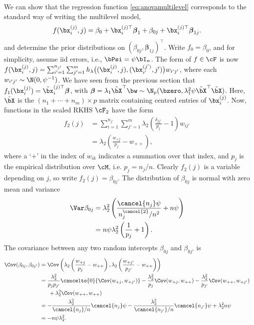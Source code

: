 We can show that the regression function \eqref{eq:anovamultilevel} corresponds to the standard way of writing the multilevel model, 
\[
  f(\bx_i^{(j)}, j) = \beta_0 + \bx_i^{(j)\top}\boldsymbol{\beta}_1 + \beta_{0j} + \bx_i^{(j)\top}\boldsymbol{\beta}_{1j}.   
\]
and determine the prior distributions on $(\beta_{0j},\boldsymbol{\beta}_{1j})^\top$.
Write $f_0=\beta_0$, and for simplicity, assume iid errors, i.e.,  $\bPsi = \psi\bI_n$.
The form of $f\in\cF$ is now $f(\bx_i^{(j)},j) = \sum_{i'=1}^{n_{j'}}\sum_{j'=1}^m h_\lambda\big((\bx_i^{(j)},j),(\bx_{i'}^{(j')},j')\big) w_{i'j'}$, where each $w_{i'j'}\sim\N(0,\psi^{-1})$.
We have seen from the previous section that $f_1(\bx_i^{(j)}) = \tilde\bx_i^{(j)\top}\boldsymbol{\beta}$, with $\boldsymbol{\beta} = \lambda_1\tilde\bX^\top\bw \sim \N_p(\bzero, \lambda_1^2\psi \tilde\bX^\top\tilde\bX )$.
Here, $\tilde\bX$ is the $(n_1+\cdots+n_m) \times p$ matrix containing centred entries of $\bx_i^{(j)}$.
Now, functions in the scaled RKHS $\cF_2$ have the form
\begin{align*}
  f_2(j) 
  &= \sum_{i=1}^{n_{j'}}\sum_{j'=1}^m \lambda_2\left( \frac{\delta_{jj'}}{p_j} - 1 \right)w_{ij'} \\
  &=  \lambda_2\left( \frac{w_{+j}}{p_j} - w_{++} \right),
\end{align*}
where a `$+$' in the index of $w_{ik}$ indicates a summation over that index, and $p_j$ is the empirical distribution over $\cM$, i.e. $p_j = n_j/n$.
Clearly $f_2(j)$ is a variable depending on $j$, so write $f_2(j)=\beta_{0j}$.
The distribution of $\beta_{0j}$ is normal with zero mean and variance
\begin{align*}
  \Var \beta_{0j} 
  &= \lambda_2^2 \left( \frac{\cancel{n_j}\psi}{n_j^{\cancel{2}} / n^2} + n\psi \right)  \\
  &= n\psi\lambda_2^2 \left( \frac{1}{p_j} + 1 \right).
\end{align*}
The covariance between any two random intercepts $\beta_{0j}$ and $\beta_{0j'}$ is
\begin{align*}
  \Cov(\beta_{0j},\beta_{0j'})
  &= \Cov\left( \lambda_2\left( \frac{w_{+j}}{p_j} - w_{++} \right), \lambda_2\left( \frac{w_{+j'}}{p_{j'}} - w_{++} \right) \right)  \\
  &= \frac{\lambda_2^2}{p_j p_{j'}} \cancelto{0}{\Cov(w_{+j},w_{+j'})} - \frac{\lambda_2^2}{p_j} \Cov(w_{+j},w_{++}) - \frac{\lambda_2^2}{p_{j'}} \Cov(w_{++},w_{+j'}) \\
  &\phantom{==} + \lambda_2^2 \Cov(w_{++},w_{++}) \\
  &= - \frac{\lambda_2^2}{\cancel{n_j}/n} \cancel{n_j}\psi - \frac{\lambda_2^2}{\cancel{n_{j'}}/n} \cancel{n_{j'}}\psi + \lambda_2^2 n\psi \\
  &= -n\psi\lambda_2^2.
\end{align*}

